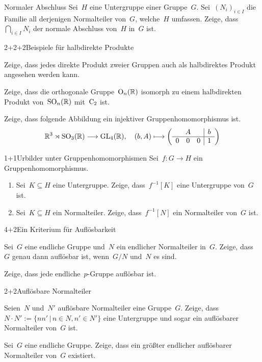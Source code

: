 \documentclass{algblatt}
\begin{document}

\begin{aufgabe}{2}{Normaler Abschluss}
Sei~$H$ eine Untergruppe einer Gruppe~$G$. Sei~$(N_i)_{i \in I}$ die Familie
all derjenigen Normalteiler von~$G$, welche~$H$ umfassen. Zeige,
dass~$\bigcap_{i \in I} N_i$ der normale Abschluss von~$H$ in~$G$ ist.
\end{aufgabe}

\begin{aufgabeE}{2+2+2}{Beispiele für halbdirekte Produkte}
\item Zeige, dass jedes direkte Produkt zweier Gruppen auch als halbdirektes
Produkt angesehen werden kann.
\item Zeige, dass die orthogonale Gruppe~$\mathrm{O}_n(\mathbb{R})$ isomorph zu einem
halbdirekten Produkt von~$\mathrm{SO}_n(\mathbb{R})$ mit~$\mathrm{C}_2$ ist.
\item Zeige, dass folgende Abbildung ein injektiver Gruppenhomomorphismus ist.
\[ \RR^3 \rtimes \SO_3(\RR) \longrightarrow \GL_4(\RR),\quad
  (b, A) \longmapsto \left(\begin{array}{ccc|c}
    \multicolumn{3}{c|}{A} & b \\\hline
    0 & 0 & 0 & 1
  \end{array}\right) \]
\end{aufgabeE}
\vspace{-1em}

\begin{aufgabe}{1+1}{Urbilder unter Gruppenhomomorphismen}
Sei~$f : G \to H$ ein Gruppenhomomorphismus.
\begin{enumerate}
\item Sei~$K \subseteq H$ eine Untergruppe. Zeige, dass~$f^{-1}[K]$
eine Untergruppe von~$G$ ist.
\item Sei~$K \subseteq H$ ein Normalteiler. Zeige, dass~$f^{-1}[N]$
ein Normalteiler von~$G$ ist.
\end{enumerate}
\end{aufgabe}

\begin{aufgabeE}{4+2}{Ein Kriterium für Auflösbarkeit}
\item Sei~$G$ eine endliche Gruppe und~$N$ ein endlicher Normalteiler in~$G$.
Zeige, dass~$G$ genau dann auflösbar ist, wenn~$G/N$ und~$N$ es sind.
\item Zeige, dass jede endliche~$p$-Gruppe auflösbar ist.
\end{aufgabeE}

\begin{aufgabeE}{2+2}{Auflösbare Normalteiler}
\item Seien~$N$ und~$N'$ auflösbare Normalteiler eine Gruppe~$G$. Zeige,
dass~$N \cdot N' := \{ n n' \,|\, n \in N, n' \in N' \}$ eine Untergruppe und
sogar ein auflösbarer Normalteiler von~$G$ ist.
\item Sei~$G$ eine endliche Gruppe. Zeige, dass ein größter endlicher
auflösbarer Normalteiler von~$G$ existiert.
\end{aufgabeE}
\end{document}

